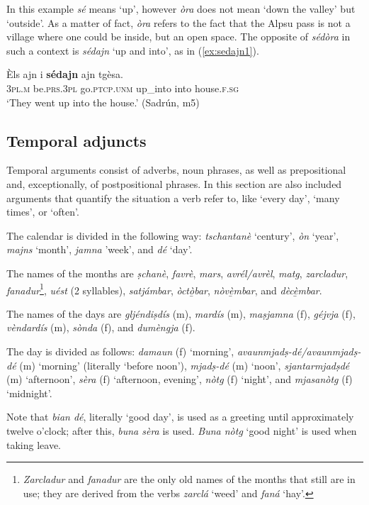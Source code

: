 In this example \textit{sé} means `up', however \textit{òra} does not mean `down the valley' but `outside'. As a matter of fact, \textit{òra} refers to the fact that the Alpsu pass is not a village where one could be inside, but an open space. The opposite of \textit{sédòra} in such a context is \textit{sédajn} `up and into', as in (\ref{ex:sedajn1}).

\ea
\label{ex:sedajn1}
\gll Èls ajn i \textbf{sédajn} ajn tgèsa.\\
\textsc{3pl.m} be.\textsc{prs.3pl} go.\textsc{ptcp.unm} up\_into into house.\textsc{f.sg}\\
\glt `They went up into the house.' (Sadrún, m5)
\z

\subsection{Temporal adjuncts}
Temporal arguments consist of adverbs, noun phrases, as well as prepositional and, exceptionally, of postpositional phrases. In this section are also included arguments that quantify the situation a verb refer to, like `every day', `many times', or `often'.

The calendar is divided in the following way: \textit{tschantanè} `century', \textit{òn} `year', \textit{majns} `month', \textit{jamna} 'week', and \textit{dé} `day'.

The names of the months are \textit{ṣchanè}, \textit{favrè}, \textit{mars}, \textit{avrél/avrèl}, \textit{matg}, \textit{zarcladur}, \textit{fanadur}\footnote{\textit{Zarcladur} and \textit{fanadur} are the only old names of the months that still are in use; they are derived from the verbs \textit{zarclá} `weed' and \textit{faná} `hay'.}, \textit{uést} (2 syllables), \textit{satjámbar}, \textit{òctò̱bar}, \textit{nòvè̱mbar}, and \textit{dècè̱mbar}.

The names of the days are \textit{gljéndiṣdís} (m), \textit{mardís} (m), \textit{maṣjamna} (f), \textit{géjvja} (f), \textit{vèndardís} (m), \textit{sònda} (f), and \textit{dumèngja} (f).

The day is divided as follows: \textit{damaun} (f) `morning', \textit{avaunmjadṣ-dé/avaunmjadṣ-dé} (m) `morning' (literally `before noon'), \textit{mjadṣ-dé} (m) `noon', \textit{sjantarmjadṣdé} (m) `afternoon', \textit{sèra} (f) `afternoon, evening', \textit{nòtg} (f) `night', and \textit{mjasanòtg} (f) `midnight'.

Note that \textit{bian dé}, literally `good day', is used as a greeting until approximately twelve o'clock; after this, \textit{buna sèra} is used. \textit{Buna nòtg} `good night' is used when taking leave. 

